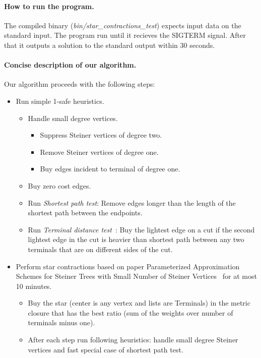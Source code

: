 \documentclass[review,a4paper]{article}
\begin{document}
\paragraph{How to run the program.}
The compiled binary (\emph{bin/star\_contractions\_test}) expects input data on the standard input. The program run until it recieves the SIGTERM signal. After that it outputs a solution to the standard output within 30 seconds.

\paragraph{Concise description of our algorithm.}
Our algorithm proceeds with the following steps:

\begin{itemize}
  \item Run simple 1-safe heuristics.
  \begin{itemize}
  \item Handle small degree vertices.
    \begin{itemize}
      \item Suppress Steiner vertices of degree two.
      \item Remove Steiner vertices of degree one.
      \item Buy edges incident to terminal of degree one.
    \end{itemize}
  \item Buy zero cost edges.
  \item Run \emph{Shortest path test}: Remove edges longer than the length of the shortest path between the endpoints.
  \item Run \emph{Terminal distance test}~\cite{TDT}: Buy the lightest edge on a cut if the second lightest edge in the cut is heavier than shortest path between any two terminals that are on different sides of the cut.
  \end{itemize}
\item Perform star contractions based on paper Parameterized Approximation Schemes for Steiner Trees with Small Number of Steiner Vertices~\cite{stars} for at most 10 minutes.
  \begin{itemize}
    \item  Buy the star (center is any vertex and lists are Terminals) in the metric closure that has the best ratio (sum of the weights over number of terminals minus one).
    \item After each step run following heuristics: handle small degree Steiner vertices and fast special case of shortest path test.

\end{itemize}
\end{itemize}
\end{document}
